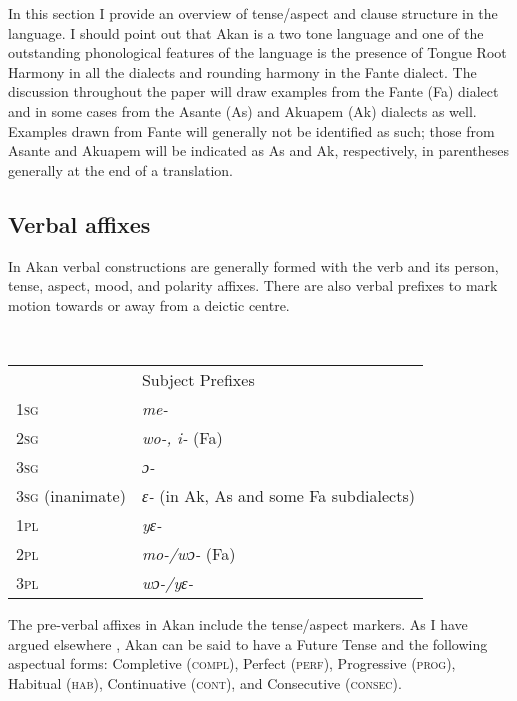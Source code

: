 \documentclass[output=paper]{langsci/langscibook}
\begin{document}
In this section I provide an overview of tense/aspect and clause structure in the language. I should point out that Akan is a two tone language and one of the outstanding phonological features of the language is the presence of Tongue Root Harmony in all the dialects and rounding harmony in the Fante dialect. The discussion throughout the paper will draw examples from the Fante (Fa) dialect and in some cases from the Asante (As) and Akuapem (Ak) dialects as well. Examples drawn from Fante will generally not be identified as such; those from Asante and Akuapem will be indicated as As and Ak, respectively, in parentheses generally at the end of a translation.

\subsection{Verbal affixes}\label{§2.1:verbal.osam}

In Akan verbal constructions are generally formed with the verb and its person, tense, aspect, mood, and polarity affixes. There are also verbal prefixes to mark motion towards or away from a deictic centre.

\ea
\label{ex:1.osam}
 \\
\begin{table}
\begin{tabular}{ll}
 & Subject Prefixes \\
     \textsc{1sg} & \textit{me-}\\
     \textsc{2sg} & \textit{wo-, i-} (Fa)\\
     \textsc{3sg} & \textit{ɔ-}\\
     \textsc{3sg} (inanimate) & \textit{ɛ-} (in Ak, As and some Fa subdialects)\\
     \textsc{1pl} & \textit{yɛ-}\\
     \textsc{2pl} & \textit{mo-/wɔ-} (Fa)\\
     \textsc{3pl} & \textit{wɔ-/yɛ-}\\
\end{tabular}
\end{table}
\z

The pre-verbal affixes in Akan include the tense/aspect markers. As I have argued elsewhere \citep{osam1994a,osam2008b}, Akan can be said to have a Future Tense and the following aspectual forms: Completive (\textsc{compl}), Perfect (\textsc{perf}), Progressive (\textsc{prog}), Habitual (\textsc{hab}), Continuative (\textsc{cont}), and Consecutive (\textsc{consec}).
\end{document}
